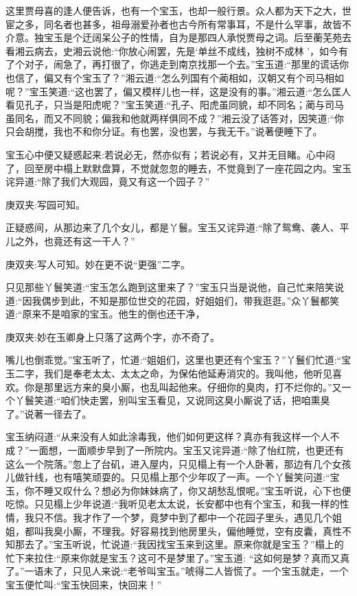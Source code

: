 \begin{parag}
    这里贾母喜的逢人便告诉，也有一个宝玉，也却一般行景。众人都为天下之大，世宦之多，同名者也甚多，祖母溺爱孙者也古今所有常事耳，不是什么罕事，故皆不介意。独宝玉是个迂阔呆公子的性情，自为是那四人承悦贾母之词。后至蘅芜苑去看湘云病去，史湘云说他:“你放心闹罢，先是‘单丝不成线，独树不成林 ’，如今有了个对子，闹急了，再打很了，你逃走到南京找那一个去。”宝玉道:“那里的谎话你也信了，偏又有个宝玉了？”湘云道:“怎么列国有个蔺相如，汉朝又有个司马相如呢？”宝玉笑道:“这也罢了，偏又模样儿也一样，这是没有的事。”湘云道:“怎么匡人看见孔子，只当是阳虎呢？”宝玉笑道:“孔子、阳虎虽同貌，却不同名；蔺与司马虽同名，而又不同貌；偏我和他就两样俱同不成？”湘云没了话答对，因笑道:“你只会胡搅，我也不和你分证。有也罢，没也罢，与我无干。”说著便睡下了。
\end{parag}


\begin{parag}
    宝玉心中便又疑惑起来:若说必无，然亦似有；若说必有，又并无目睹。心中闷了，回至房中榻上默默盘算，不觉就忽忽的睡去，不觉竟到了一座花园之内。宝玉诧异道:“除了我们大观园，竟又有这一个园子？”\begin{note}庚双夹:写园可知。\end{note}正疑惑间，从那边来了几个女儿，都是丫鬟。宝玉又诧异道:“除了鸳鸯、袭人、平儿之外，也竟还有这一干人？”\begin{note}庚双夹:写人可知。妙在更不说“更强”二字。\end{note}只见那些丫鬟笑道:“宝玉怎么跑到这里来了？”宝玉只当是说他，自己忙来陪笑说道:“因我偶步到此，不知是那位世交的花园，好姐姐们，带我逛逛。”众丫鬟都笑道:“原来不是咱家的宝玉。他生的倒也还干净，\begin{note}庚双夹:妙在玉卿身上只落了这两个字，亦不奇了。\end{note}嘴儿也倒乖觉。”宝玉听了，忙道:“姐姐们，这里也更还有个宝玉？”丫鬟们忙道:“宝玉二字，我们是奉老太太、太太之命，为保佑他延寿消灾的。我叫他，他听见喜欢。你是那里远方来的臭小厮，也乱叫起他来。仔细你的臭肉，打不烂你的。”又一个丫鬟笑道:“咱们快走罢，别叫宝玉看见，又说同这臭小厮说了话，把咱熏臭了。”说著一径去了。
\end{parag}


\begin{parag}
    宝玉纳闷道:“从来没有人如此涂毒我，他们如何更这样？真亦有我这样一个人不成？”一面想，一面顺步早到了一所院内。宝玉又诧异道:“除了怡红院，也更还有这么一个院落。”忽上了台矶，进入屋内，只见榻上有一个人卧著，那边有几个女孩儿做针线，也有嘻笑顽耍的。只见榻上那个少年叹了一声。一个丫鬟笑问道:“宝玉，你不睡又叹什么？想必为你妹妹病了，你又胡愁乱恨呢。”宝玉听说，心下也便吃惊。只见榻上少年说道:“我听见老太太说，长安都中也有个宝玉，和我一样的性情，我只不信。我才作了一个梦，竟梦中到了都中一个花园子里头，遇见几个姐姐，都叫我臭小厮，不理我。好容易找到他房里头，偏他睡觉，空有皮囊，真性不知那去了。”宝玉听说，忙说道:“我因找宝玉来到这里。原来你就是宝玉？”榻上的忙下来拉住:“原来你就是宝玉？这可不是梦里了。”宝玉道: “这如何是梦？真而又真了。”一语未了，只见人来说:“老爷叫宝玉。”唬得二人皆慌了。一个宝玉就走，一个宝玉便忙叫:“宝玉快回来，快回来！”
\end{parag}


